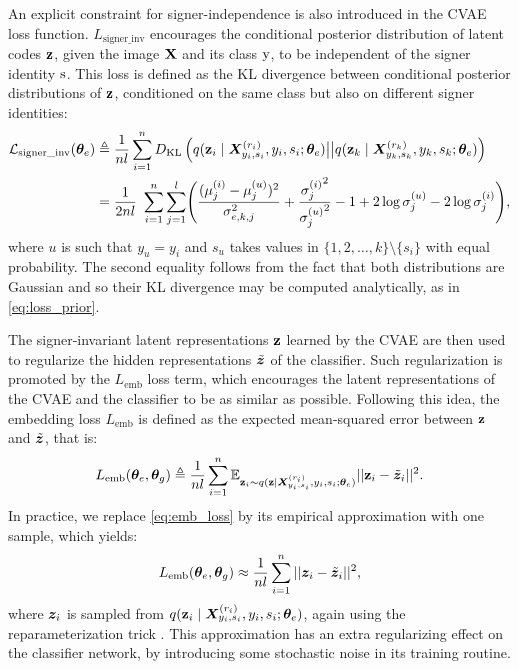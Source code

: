 An explicit constraint for signer-independence is also introduced in the CVAE loss function. $L_{\text{signer\_inv}}$ encourages the conditional posterior distribution of latent codes ${\mathbf{z}}$, given the image ${\mathbf{X}}$ and its class ${\textnormal{y}}$, to be independent of the signer identity ${\textnormal{s}}$. This loss is defined as the KL divergence between conditional posterior distributions of ${\mathbf{z}}$, conditioned on the same class but also on different signer identities:
\begin{align}
    \label{eq:loss_signer_inv}
    \mathcal{L}_{\text{signer\_inv}}({\bm{\theta}}_{e}) &\triangleq \frac{1}{nl} \sum_{i=1}^{n}D_{\mathrm{KL}}\left(q({\mathbf{z}}_{i} \mid {\bm{X}}^{(r_{i})}_{y_{i},s_{i}}, y_{i}, s_{i}; {\bm{\theta}}_e) \big| \big| q({\mathbf{z}}_{k} \mid {\bm{X}}^{(r_{k})}_{y_{k},s_{k}}, y_{k}, s_{k}; {\bm{\theta}}_e)\right) \nonumber\\
    &=\frac{1}{2nl}~\sum_{i=1}^{n}\sum_{j=1}^{l} \Biggl(\frac{(\mu^{(i)}_j - \mu^{(u)}_j)^2}{\sigma_{e,k,j}^2} + \frac{{\sigma^{(i)}_j}^2}{{\sigma^{(u)}_j}^2} -1 + 2\log {\sigma^{(u)}_j} - 2\log {\sigma^{(i)}_j} \Biggr),
\end{align}
where $u$ is such that $y_{u}=y_{i}$ and $s_u$ takes values in $\{1,2,\dots,k\} \setminus \lbrace s_i \rbrace$ with equal probability. The second equality follows from the fact that both distributions are Gaussian and so their KL divergence may be computed analytically, as in \eqref{eq:loss_prior}.

The signer-invariant latent representations ${\mathbf{z}}$ learned by the CVAE are then used to regularize the hidden representations $\tilde{{\bm{z}}}$ of the classifier. Such regularization is promoted by the $L_{\text{emb}}$ loss term, which encourages the latent representations of the CVAE and the classifier to be as similar as possible. Following this idea, the embedding loss $L_{\text{emb}}$ is defined as the expected mean-squared error between ${\mathbf{z}}$ and $\tilde{{\bm{z}}}$, that is:
\begin{equation}
    \label{eq:emb_loss}
    L_{\text{emb}}({\bm{\theta}}_e, {\bm{\theta}}_g) \triangleq \frac{1}{nl} \sum_{i=1}^{n} \mathbb{E}_{{\mathbf{z}}_{i} \sim q({\mathbf{z}} \mid {\bm{X}}^{(r_{i})}_{y_{i},s_{i}}, y_{i}, s_{i}; {\bm{\theta}}_e)}||{\mathbf{z}}_i-\tilde{{\bm{z}}}_i||^2.
\end{equation}
In practice, we replace \eqref{eq:emb_loss} by its empirical approximation with one sample, which yields:
\begin{equation}
    L_{\text{emb}}({\bm{\theta}}_e, {\bm{\theta}}_g) \approx \frac{1}{nl} \sum_{i=1}^{n}||{\bm{z}}_i-\tilde{{\bm{z}}}_i||^2,
\end{equation}
where ${\bm{z}}_i$ is sampled from $q({\mathbf{z}}_{i} \mid {\bm{X}}^{(r_{i})}_{y_{i},s_{i}}, y_{i}, s_{i}; {\bm{\theta}}_e)$, again using the reparameterization trick . This approximation has an extra regularizing effect on the classifier network, by introducing some stochastic noise in its training routine.

